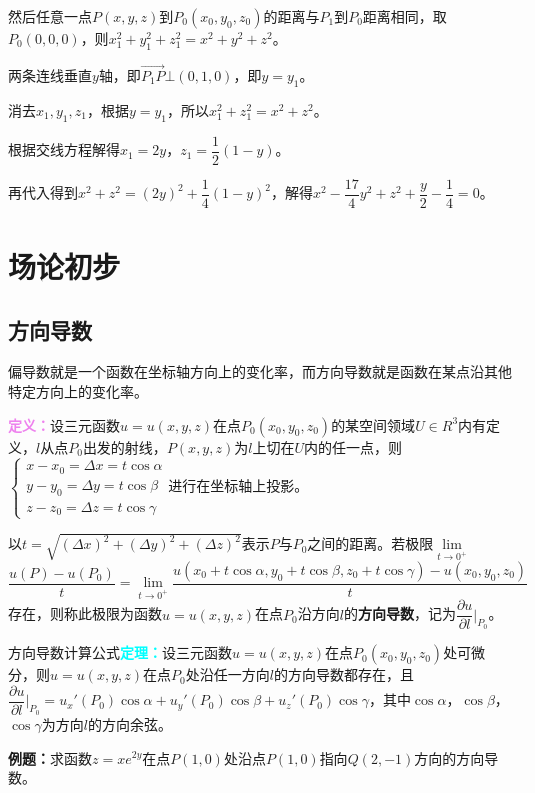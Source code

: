 \documentclass[UTF8, 12pt]{ctexart}
\begin{document}
然后任意一点$P(x,y,z)$到$P_0(x_0,y_0,z_0)$的距离与$P_1$到$P_0$距离相同，取$P_0(0,0,0)$，则$x_1^2+y_1^2+z_1^2=x^2+y^2+z^2$。

两条连线垂直$y$轴，即$\overrightarrow{P_1P}\bot(0,1,0)$，即$y=y_1$。

消去$x_1,y_1,z_1$，根据$y=y_1$，所以$x_1^2+z_1^2=x^2+z^2$。

根据交线方程解得$x_1=2y$，$z_1=\dfrac{1}{2}(1-y)$。

再代入得到$x^2+z^2=(2y)^2+\dfrac{1}{4}(1-y)^2$，解得$x^2-\dfrac{17}{4}y^2+z^2+\dfrac{y}{2}-\dfrac{1}{4}=0$。

\section{场论初步}

\subsection{方向导数}

偏导数就是一个函数在坐标轴方向上的变化率，而方向导数就是函数在某点沿其他特定方向上的变化率。

\textcolor{violet}{\textbf{定义：}}设三元函数$u=u(x,y,z)$在点$P_0(x_0,y_0,z_0)$的某空间领域$U\in R^3$内有定义，$l$从点$P_0$出发的射线，$P(x,y,z)$为$l$上切在$U$内的任一点，则$\left\{\begin{array}{l}
    x-x_0=\Delta x=t\cos\alpha \\
    y-y_0=\Delta y=t\cos\beta \\
    z-z_0=\Delta z=t\cos\gamma
\end{array}\right.$进行在坐标轴上投影。

以$t=\sqrt{(\Delta x)^2+(\Delta y)^2+(\Delta z)^2}$表示$P$与$P_0$之间的距离。若极限$\lim\limits_{t\to0^+}$\\$\dfrac{u(P)-u(P_0)}{t}=\lim\limits_{t\to0^+}\dfrac{u(x_0+t\cos\alpha,y_0+t\cos\beta,z_0+t\cos\gamma)-u(x_0,y_0,z_0)}{t}$存在，则称此极限为函数$u=u(x,y,z)$在点$P_0$沿方向$l$的\textbf{方向导数}，记为$\dfrac{\partial u}{\partial l}\bigg|_{P_0}$。

方向导数计算公式\textcolor{aqua}{\textbf{定理：}}设三元函数$u=u(x,y,z)$在点$P_0(x_0,y_0,z_0)$处可微分，则$u=u(x,y,z)$在点$P_0$处沿任一方向$l$的方向导数都存在，且$\dfrac{\partial u}{\partial l}\bigg|_{P_0}=u_x'(P_0)\cos\alpha+u_y'(P_0)\cos\beta+u_z'(P_0)\cos\gamma$，其中$\cos\alpha$，$\cos\beta$，$\cos\gamma$为方向$l$的方向余弦。

\textbf{例题：}求函数$z=xe^{2y}$在点$P(1,0)$处沿点$P(1,0)$指向$Q(2,-1)$方向的方向导数。
\end{document}
